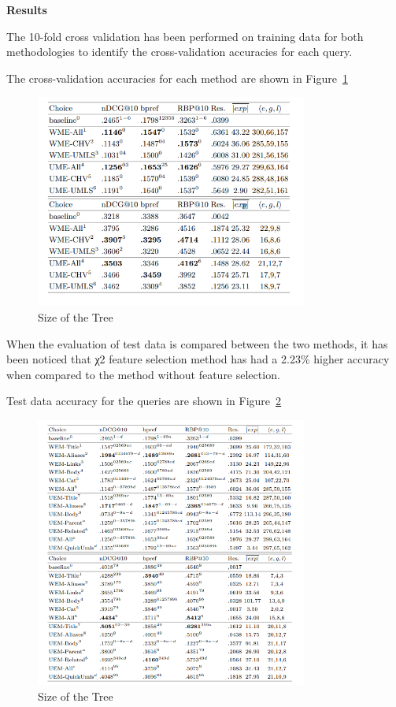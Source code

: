 \documentclass[]{article}
\begin{document}
\textbf{Results}

The 10-fold cross validation has been performed on training data for both methodologies to identify the cross-validation accuracies for each query. 

The cross-validation accuracies for each method are shown in Figure~\ref{fig29} 

\begin{figure}[b!]
	\includegraphics[width=0.8\textwidth]{Capture29.png}
	\caption{Size of the Tree\label{fig29}}
\end{figure} 

When the evaluation of test data is compared between the two methods, it has been noticed that χ2 feature selection method has had a 2.23\% higher accuracy when compared to the method without feature selection. 

Test data accuracy for the queries are shown in Figure~\ref{fig30}

\begin{figure}[t!]
	\includegraphics[width=0.8\textwidth]{Capture30.png}
	\caption{Size of the Tree\label{fig30}}
\end{figure}   
\end{document}
